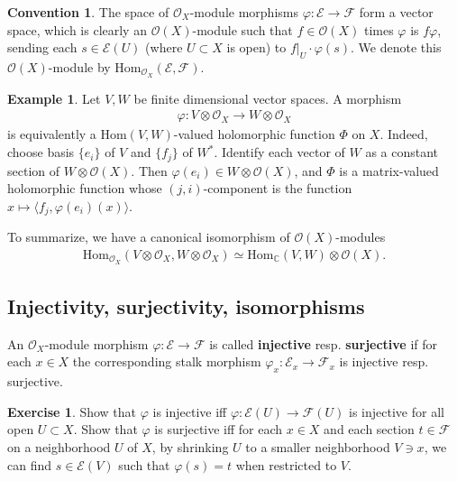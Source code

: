 \documentclass[11pt,b5paper,notitlepage]{article}
\theoremstyle{definition}
\newtheorem{eg}[df]{Example}
\newtheorem{exe}[df]{Exercise}
\newtheorem{cv}[df]{Convention}
\theoremstyle{plain}
\newcommand{\Hom}{\mathrm{Hom}}
\newcommand{\bk}[1]{\langle {#1}\rangle}
\newcommand{\scr}{\mathscr}
\newcommand{\Cbb}{\mathbb C}
\numberwithin{equation}{section}
\begin{document}
\begin{cv}\label{lba103}
	The space of $\scr O_X$-module morphisms $\varphi:\scr E\rightarrow\scr F$ form a vector space, which is clearly an $\scr O(X)$-module such that $f\in\scr O(X)$ times $\varphi$ is $f\varphi$, sending each $s\in \scr E(U)$ (where $U\subset X$ is open) to $f|_U\cdot \varphi(s)$. We denote this $\scr O(X)$-module by $\Hom_{\scr O_X}(\scr E,\scr F)$. \index{HomEF@$\Hom_{\scr O_X}(\scr E,\scr F)$}
\end{cv}



\begin{eg}\label{lba104}
	Let $V,W$ be finite dimensional vector spaces. A morphism 
	\begin{align*}
		\varphi:V\otimes\scr O_X\rightarrow W\otimes\scr O_X	
	\end{align*}
	is equivalently a $\Hom(V,W)$-valued holomorphic function $\Phi$ on $X$. Indeed, choose basis $\{e_i\}$ of $V$ and $\{f_j\}$ of $W^*$. Identify each vector of $W$ as a constant section of $W\otimes\scr O(X)$. Then $\varphi(e_i)\in W\otimes\scr O(X)$, and $\Phi$  is a matrix-valued holomorphic function whose $(j,i)$-component is the function $x\mapsto\bk{f_j,\varphi(e_i)(x)}$.
	
	To summarize, we have a canonical isomorphism of $\scr O(X)$-modules
	\begin{align*}
		\Hom_{\scr O_X}(V\otimes\scr O_X,W\otimes\scr O_X)\simeq \Hom_\Cbb(V,W)\otimes\scr O(X).	
	\end{align*}
	\hfill\qedsymbol
\end{eg}




\subsection{Injectivity, surjectivity, isomorphisms}

An $\scr O_X$-module morphism $\varphi:\scr E\rightarrow\scr F$ is called \textbf{injective} resp. \textbf{surjective} if for each $x\in X$ the corresponding stalk morphism $\varphi_x:\scr E_x\rightarrow\scr F_x$ is injective resp. surjective.

\begin{exe}
	Show that $\varphi$ is injective iff $\varphi:\scr E(U)\rightarrow\scr F(U)$ is injective for all open $U\subset X$. Show that $\varphi$ is surjective iff for each $x\in X$ and each section $t\in\scr F$ on a neighborhood $U$ of $X$, by shrinking $U$ to a smaller neighborhood $V\ni x$, we can find $s\in\scr E(V)$ such that $\varphi(s)=t$ when restricted to $V$.
\end{exe}
\end{document}
